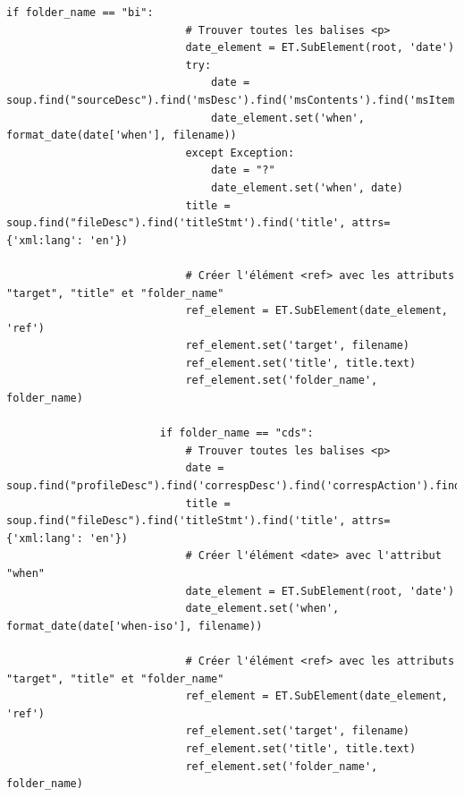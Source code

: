 \begin{lstlisting}[style=pythonStyle, caption=script python pour générer les timeline.xml]
                        if folder_name == "bi":
                            # Trouver toutes les balises <p>
                            date_element = ET.SubElement(root, 'date')
                            try:
                                date = soup.find("sourceDesc").find('msDesc').find('msContents').find('msItem').find('docDate')
                                date_element.set('when', format_date(date['when'], filename))
                            except Exception:
                                date = "?"
                                date_element.set('when', date)
                            title = soup.find("fileDesc").find('titleStmt').find('title', attrs={'xml:lang': 'en'})

                            # Créer l'élément <ref> avec les attributs "target", "title" et "folder_name"
                            ref_element = ET.SubElement(date_element, 'ref')
                            ref_element.set('target', filename)
                            ref_element.set('title', title.text)
                            ref_element.set('folder_name', folder_name)

                        if folder_name == "cds":
                            # Trouver toutes les balises <p>
                            date = soup.find("profileDesc").find('correspDesc').find('correspAction').find('date')
                            title = soup.find("fileDesc").find('titleStmt').find('title', attrs={'xml:lang': 'en'})
                            # Créer l'élément <date> avec l'attribut "when"
                            date_element = ET.SubElement(root, 'date')
                            date_element.set('when', format_date(date['when-iso'], filename))

                            # Créer l'élément <ref> avec les attributs "target", "title" et "folder_name"
                            ref_element = ET.SubElement(date_element, 'ref')
                            ref_element.set('target', filename)
                            ref_element.set('title', title.text)
                            ref_element.set('folder_name', folder_name)


\end{lstlisting}
